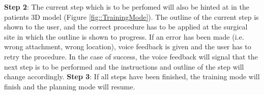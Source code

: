 \textbf{Step 2}: The current step which is to be perfomed will also be hinted at in the patients 3D model (Figure \ref{fig::TrainingMode}).
The outline of the current step is shown to the user, and the correct procedure has to be applied at the surgical site in which the outline is shown to progress.
If an error has been made (i.e. wrong attachment, wrong location), voice feedback is given and the user has to retry the procedure.
In the case of success, the voice feedback will signal that the next step is to be performed and the instructions and outline of the step will change accordingly.
\newline
\textbf{Step 3}: If all steps have been finished, the training mode will finish and the planning mode will resume.
